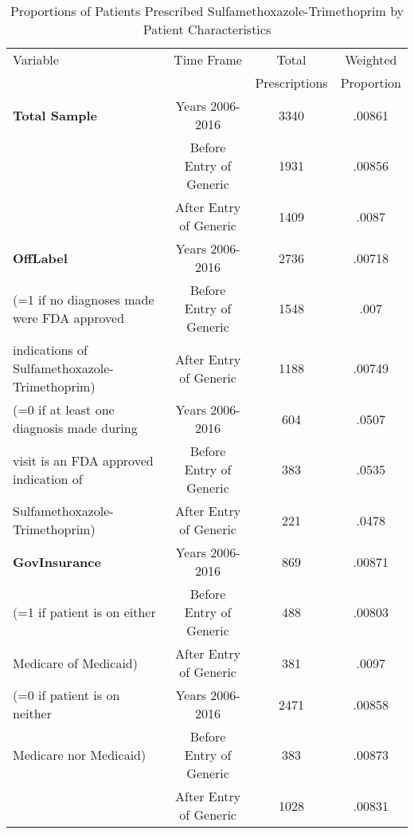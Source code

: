\begin{table}[htbp]\centering
\def\sym#1{\ifmmode^{#1}\else\(^{#1}\)\fi}
\caption{Proportions of Patients Prescribed Sulfamethoxazole-Trimethoprim by Patient Characteristics\label{tab1}}
\begin{tabular}{l*{3}{c}}
\hline\hline
            Variable&\multicolumn{1}{c}{Time Frame}&\multicolumn{1}{c}{Total}&\multicolumn{1}{c}{Weighted}\\
            &&Prescriptions&Proportion\\
\hline
\textbf{Total Sample}                                   &     Years 2006-2016&                          3340&     .00861\\
                                                        &     Before Entry of Generic&    1931&     .00856\\
                                                        &     After Entry of Generic&      1409&     .0087\\
[.5em]
\textbf{OffLabel}                                       &     Years 2006-2016&             2736&     .00718\\
(=1 if no diagnoses made were FDA approved         &     Before Entry of Generic&    1548&     .007\\
indications of Sulfamethoxazole-Trimethoprim)  &     After Entry of Generic&      1188&     .00749\\
[.5em]
(=0 if at least one diagnosis made during               &     Years 2006-2016&             604&     .0507\\
visit is an FDA approved indication of                  &     Before Entry of Generic&    383&     .0535\\
Sulfamethoxazole-Trimethoprim)                          &     After Entry of Generic&      221&     .0478\\
[.5em]
\textbf{GovInsurance}                                   &     Years 2006-2016&             869&     .00871\\
(=1 if patient is on either       &     Before Entry of Generic&     488 &     .00803\\
 Medicare of Medicaid)            &     After Entry of Generic&      381 &     .0097\\
[.5em]
(=0 if patient is on neither     &     Years 2006-2016&             2471&     .00858\\
 Medicare nor Medicaid)          &     Before Entry of Generic&     383 &     .00873\\
                                                        &     After Entry of Generic&      1028 &     .00831\\

\end{tabular}
\end{table}
